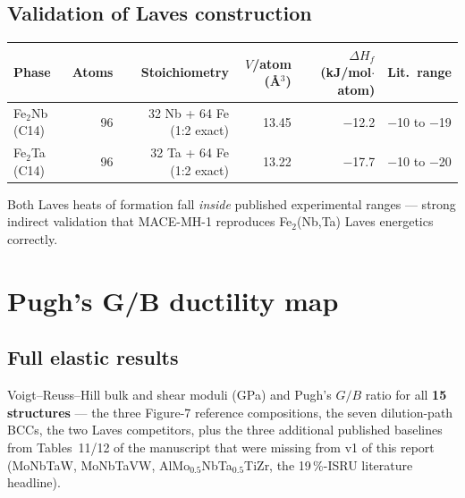 \documentclass[11pt,a4paper]{article}
\begin{document}
\subsection{Validation of Laves construction}

\begin{center}
\begin{tabular}{lrrrrl}
\toprule
\textbf{Phase} & \textbf{Atoms} & \textbf{Stoichiometry} &
\textbf{$V$/atom (\AA$^3$)} & \textbf{$\Delta H_f$ (kJ/mol$\cdot$atom)} &
\textbf{Lit.\ range}\\
\midrule
Fe$_2$Nb (C14) & 96 & 32 Nb + 64 Fe (1:2 exact) & 13.45 & $-$12.2 & $-$10 to $-$19\\
Fe$_2$Ta (C14) & 96 & 32 Ta + 64 Fe (1:2 exact) & 13.22 & $-$17.7 & $-$10 to $-$20\\
\bottomrule
\end{tabular}
\end{center}

\begin{okbox}
Both Laves heats of formation fall \emph{inside} published experimental
ranges --- strong indirect validation that MACE-MH-1 reproduces Fe$_2$(Nb,Ta)
Laves energetics correctly.
\end{okbox}

\section{Pugh's G/B ductility map}
\label{sec:pugh}

\subsection{Full elastic results}

Voigt--Reuss--Hill bulk and shear moduli (GPa) and Pugh's $G/B$ ratio for all
\textbf{15 structures} --- the three Figure-7 reference compositions, the
seven dilution-path BCCs, the two Laves competitors, plus the three
additional published baselines from Tables~11/12 of the manuscript that
were missing from v1 of this report (MoNbTaW, MoNbTaVW,
AlMo$_{0.5}$NbTa$_{0.5}$TiZr, the 19\,\%-ISRU literature headline).
\end{document}
